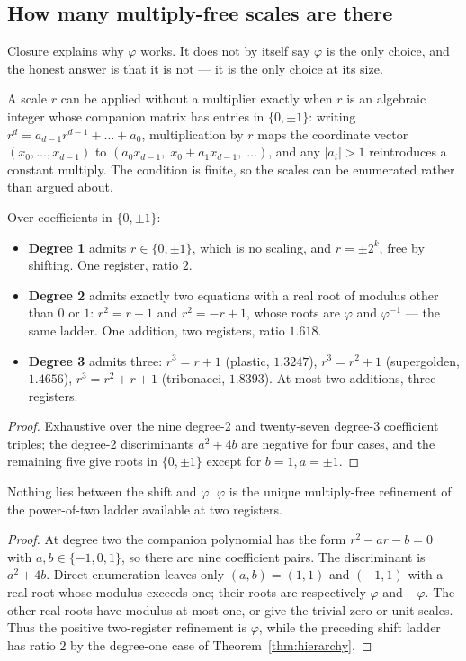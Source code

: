 \subsection{How many multiply-free scales are there}\label{sec:hierarchy}

Closure explains why $\varphi$ works. It does not by itself say $\varphi$ is the
only choice, and the honest answer is that it is not --- it is the only choice at
its size.

A scale $r$ can be applied without a multiplier exactly when $r$ is an algebraic
integer whose companion matrix has entries in $\{0,\pm1\}$: writing
$r^{d}=a_{d-1}r^{d-1}+\dots+a_0$, multiplication by $r$ maps the coordinate
vector $(x_0,\dots,x_{d-1})$ to $(a_0x_{d-1},\;x_0+a_1x_{d-1},\;\dots)$, and any
$|a_i|>1$ reintroduces a constant multiply. The condition is finite, so the
scales can be enumerated rather than argued about.

\begin{theorem}\label{thm:hierarchy}
Over coefficients in $\{0,\pm1\}$:
\begin{itemize}
\item \textbf{Degree 1} admits $r\in\{0,\pm1\}$, which is no scaling, and
      $r=\pm2^k$, free by shifting. One register, ratio $2$.
\item \textbf{Degree 2} admits exactly two equations with a real root of modulus
      other than $0$ or $1$: $r^2=r+1$ and $r^2=-r+1$, whose roots are $\varphi$
      and $\varphi^{-1}$ --- the same ladder. One addition, two registers,
      ratio $1.618$.
\item \textbf{Degree 3} admits three: $r^3=r+1$ (plastic, $1.3247$),
      $r^3=r^2+1$ (supergolden, $1.4656$), $r^3=r^2+r+1$ (tribonacci,
      $1.8393$). At most two additions, three registers.
\end{itemize}
\end{theorem}
\begin{proof}
Exhaustive over the nine degree-2 and twenty-seven degree-3 coefficient triples;
the degree-2 discriminants $a^2+4b$ are negative for four cases, and the
remaining five give roots in $\{0,\pm1\}$ except for $b=1,a=\pm1$.
\end{proof}

\begin{corollary}\label{cor:nothing-between}
Nothing lies between the shift and $\varphi$. $\varphi$ is the unique
multiply-free refinement of the power-of-two ladder available at two registers.
\end{corollary}
\begin{proof}
At degree two the companion polynomial has the form
$r^2-ar-b=0$ with $a,b\in\{-1,0,1\}$, so there are nine coefficient pairs.
The discriminant is $a^2+4b$.  Direct enumeration leaves only
$(a,b)=(1,1)$ and $(-1,1)$ with a real root whose modulus exceeds one;
their roots are respectively $\varphi$ and $-\varphi$.  The other real
roots have modulus at most one, or give the trivial zero or unit scales.
Thus the positive two-register refinement is $\varphi$, while the preceding
shift ladder has ratio $2$ by the degree-one case of
Theorem~\ref{thm:hierarchy}.
\end{proof}

